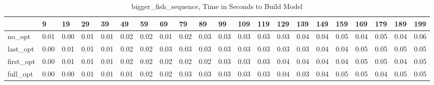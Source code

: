 \begin{table}
\caption{bigger_fish_sequence, Time in Seconds to Build Model}
\label{bigger_fish_sequence_model_time}
\begin{tabular}{lllllllllllllllllllll}
\toprule
 & 9 & 19 & 29 & 39 & 49 & 59 & 69 & 79 & 89 & 99 & 109 & 119 & 129 & 139 & 149 & 159 & 169 & 179 & 189 & 199 \\
\midrule
no_opt & 0.01 & 0.00 & 0.01 & 0.01 & 0.02 & 0.02 & 0.01 & 0.02 & 0.03 & 0.03 & 0.03 & 0.03 & 0.03 & 0.04 & 0.04 & 0.05 & 0.04 & 0.05 & 0.04 & 0.06 \\
last_opt & 0.00 & 0.01 & 0.01 & 0.01 & 0.02 & 0.02 & 0.03 & 0.03 & 0.03 & 0.03 & 0.03 & 0.03 & 0.03 & 0.03 & 0.04 & 0.04 & 0.05 & 0.05 & 0.05 & 0.05 \\
first_opt & 0.00 & 0.01 & 0.01 & 0.01 & 0.02 & 0.02 & 0.02 & 0.02 & 0.02 & 0.03 & 0.03 & 0.03 & 0.04 & 0.04 & 0.04 & 0.04 & 0.05 & 0.05 & 0.04 & 0.05 \\
full_opt & 0.00 & 0.00 & 0.01 & 0.01 & 0.01 & 0.02 & 0.02 & 0.03 & 0.03 & 0.03 & 0.03 & 0.03 & 0.04 & 0.03 & 0.04 & 0.05 & 0.05 & 0.04 & 0.05 & 0.05 \\
\bottomrule
\end{tabular}
\end{table}
